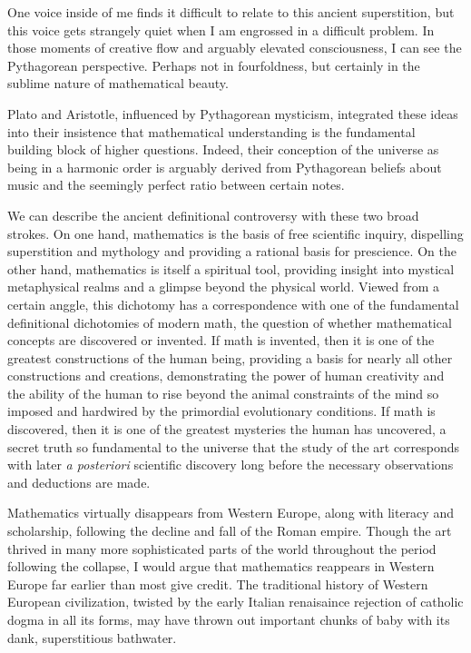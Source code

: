 \documentclass[12pt]{article}
\begin{document}
One voice inside of me finds it difficult to relate
to this ancient superstition,
but this voice gets strangely quiet
when I am engrossed in a difficult problem.
In those moments of creative flow
and arguably elevated consciousness,
I can see the Pythagorean perspective.
Perhaps not in fourfoldness,
but certainly in the sublime nature of mathematical beauty.

Plato and Aristotle,
influenced by Pythagorean mysticism,
integrated these ideas
into their insistence that mathematical understanding 
is the fundamental building block of higher questions.
Indeed, their conception of the universe as
being in a harmonic order is arguably derived from
Pythagorean beliefs about music
and the seemingly perfect ratio between certain notes.

We can describe the ancient definitional controversy
with these two broad strokes.
On one hand, mathematics is the basis of free scientific inquiry,
dispelling superstition and mythology
and providing a rational basis for prescience.
On the other hand, mathematics is itself a spiritual tool,
providing insight into mystical metaphysical realms
and a glimpse beyond the physical world.
Viewed from a certain anggle,
this dichotomy has a correspondence with one of
the fundamental definitional dichotomies
of modern math,
the question of whether mathematical concepts
are discovered or invented.
If math is invented,
then it is one of the greatest constructions of the human being,
providing a basis for nearly all other constructions and creations,
demonstrating the power of human creativity
and the ability of the human to rise beyond the animal constraints of the mind
so imposed and hardwired by the primordial evolutionary conditions.
If math is discovered,
then it is one of the greatest mysteries the human has uncovered,
a secret truth so fundamental to the universe
that the study of the art corresponds
with later \textit{a posteriori} scientific discovery
long before the necessary observations and deductions are made.

Mathematics virtually disappears from Western Europe,
along with literacy and scholarship,
following the decline and fall of the Roman empire.
Though the art thrived in many more sophisticated
parts of the world throughout the period
following the collapse,
I would argue that mathematics reappears in Western Europe
far earlier than most give credit.
The traditional history of Western European civilization,
twisted by the early Italian renaisaince rejection
of catholic dogma in all its forms,
may have thrown out important chunks of baby
with its dank, superstitious bathwater.
\end{document}

